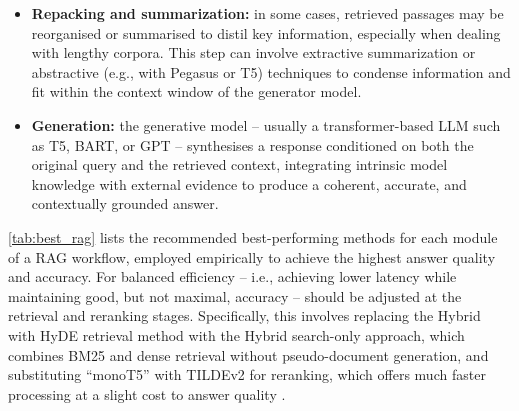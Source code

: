 \begin{spacing}{1.5}
\begin{itemize}
    \item \textbf{Repacking and summarization:} in some cases, retrieved passages may be reorganised or summarised to distil key information, especially when dealing with lengthy corpora. This step can involve extractive summarization or abstractive (e.g., with Pegasus or T5) techniques to condense information and fit within the context window of the generator model.
    \item \textbf{Generation:} the generative model -- usually a transformer-based LLM such as T5, BART, or GPT -- synthesises a response conditioned on both the original query and the retrieved context, integrating intrinsic model knowledge with external evidence to produce a coherent, accurate, and contextually grounded answer.
\end{itemize}


\autoref{tab:best_rag} lists the recommended best-performing methods for each module of a RAG workflow, employed empirically to achieve the highest answer quality and accuracy. For balanced efficiency -- i.e., achieving lower latency while maintaining good, but not maximal, accuracy -- should be adjusted at the retrieval and reranking stages. Specifically, this involves replacing the Hybrid with HyDE retrieval method with the Hybrid search-only approach, which combines BM25 and dense retrieval without pseudo-document generation, and substituting “monoT5” with TILDEv2 for reranking, which offers much faster processing at a slight cost to answer quality  \citep{wang_searching_2024}.


\end{spacing}
